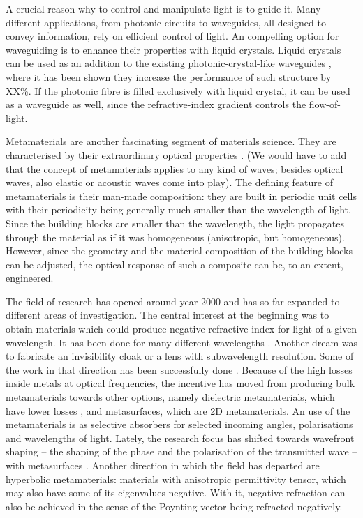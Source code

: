 \documentclass[a4paper,11pt]{article}
\begin{document}
A crucial reason why to control and manipulate light is to guide it. 
Many different applications, from photonic circuits to waveguides, all designed to convey information, rely on efficient control of light. 
An compelling option for waveguiding is to enhance their properties with liquid crystals. 
Liquid crystals can be used as an addition to the existing photonic-crystal-like waveguides \cite{dd}, where it has been shown they increase the performance of such structure by XX\%. 
If the photonic fibre is filled exclusively with liquid crystal, it can be used as a waveguide as well, since the refractive-index gradient controls the flow-of-light. 





Metamaterials are another fascinating segment of materials science. 
They are characterised by their extraordinary optical properties \cite{gja}.
(We would have to add that the concept of metamaterials applies to any kind of waves; besides optical waves, also elastic or acoustic waves come into play). 
The defining feature of metamaterials is their man-made composition: they are built in periodic unit cells with their periodicity being generally much smaller than the wavelength of light. 
Since the building blocks are smaller than the wavelength, the light propagates through the material as if it was homogeneous (anisotropic, but homogeneous). 
However, since the geometry and the material composition of the building blocks can be adjusted, the optical response of such a composite can be, to an extent, engineered. 

The field of research has opened around year 2000 \cite{koak} and has so far expanded to different areas of investigation. 
The central interest at the beginning was to obtain materials which could produce negative refractive index for light of a given wavelength. 
It has been done for many different wavelengths \cite{pwqo}. 
Another dream was to fabricate an invisibility cloak or a lens with subwavelength resolution. 
Some of the work in that direction has been successfully done \cite{lal, ei}. 
Because of the high losses inside metals at optical frequencies, the incentive has moved from producing bulk metamaterials towards other options, namely dielectric metamaterials, which have lower losses \cite{}, and metasurfaces, which are 2D metamaterials. 
An use of the metamaterials is as selective absorbers for selected incoming angles, polarisations and wavelengths of light. 
Lately, the research focus has shifted towards wavefront shaping -- the shaping of the phase and the polarisation of the transmitted wave -- with metasurfaces \cite{}.  
Another direction in which the field has departed are hyperbolic metamaterials: materials with anisotropic permittivity tensor, which may also have some of its eigenvalues negative. 
With it, negative refraction can also be achieved in the sense of the Poynting vector being refracted negatively.
\end{document}

